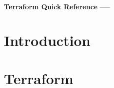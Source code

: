 \documentclass[a4paper, 11pt]{book}
\begin{document}
    \begin{titlepage}
        \centering
        \vspace*{2in}
        \Huge \textbf{Terraform Quick Reference}
        \vfill
        \Large -----
        \vfill
    \end{titlepage}

    \tableofcontents
    
    \section{Introduction}
    
    \section{Terraform}
\end{document}
